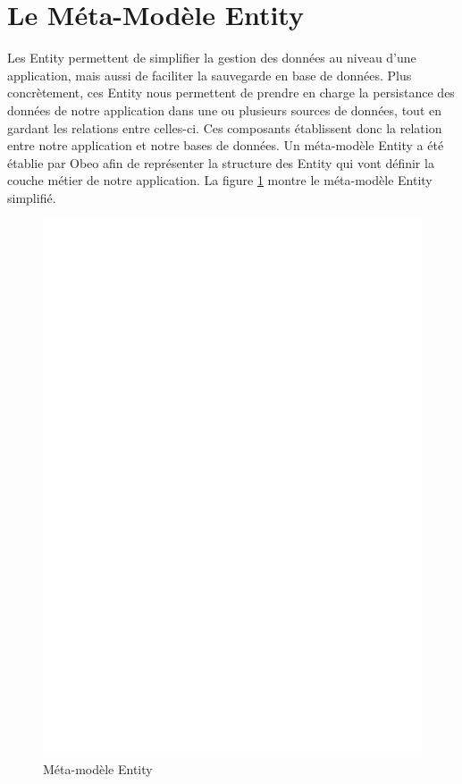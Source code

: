 \section{Le Méta-Modèle Entity}\label{sub:ent}
Les Entity permettent de simplifier la gestion des données au niveau d'une application, mais aussi de faciliter la sauvegarde en base de données. Plus concrètement, ces Entity nous permettent de prendre en charge la persistance des données de notre application dans une ou plusieurs sources de données, tout en gardant les relations entre celles-ci. Ces composants établissent donc la relation entre notre application et notre bases de données.
Un méta-modèle Entity a été établie par Obeo afin de représenter la structure des Entity qui vont définir la couche métier de notre application. La figure \ref{fig:ent}  montre le méta-modèle Entity simplifié.

\begin{figure}[H]
  \centering
  \includegraphics[scale=.4]{img/Entity.eps}
  \caption{Méta-modèle Entity}
  \label{fig:ent}
\end{figure}

